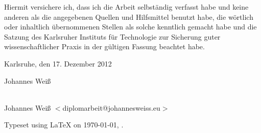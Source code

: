 \maketitle

\vspace*{\fill}


\bigskip{}

\noindent{}Hiermit versichere ich, dass ich die Arbeit selbst\"andig verfasst
habe und keine anderen als die angegebenen Quellen und Hilfsmittel benutzt habe,
die w\"ortlich oder inhaltlich \"ubernommenen Stellen als solche kenntlich
gemacht habe und die Satzung des Karlsruher Instituts f\"ur Technologie zur
Sicherung guter wissenschaftlicher Praxis in der g\"ultigen Fassung beachtet
habe.

\bigskip{}

Karlsruhe, den 17. Dezember 2012 

\bigskip{}

\bigskip{}
Johannes Wei\ss

\vspace*{\fill}

\cleardoublepage

\vspace*{\fill}
\begin{center}
{\Large \JWtitle{}} \\
Johannes Wei\ss{} $<$diplomarbeit@johannesweiss.eu$>$
\end{center}
\vspace*{\fill}

\newpage

\null
\vfill
\hfill Typeset using \LaTeX{} on \today{}, \currenttime{}.

